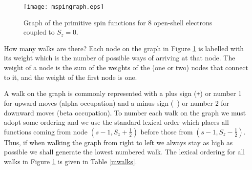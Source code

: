\documentclass[fullpage,12pt,fleqn]{article}
\newcommand{\half}{\frac{1}{2}}
\begin{document}
\begin{figure}[htbp]

\center

\texttt{[image: mspingraph.eps]}
\caption{\label{mgraph} Graph of the primitive spin functions for 8
open-shell electrons coupled to $S_z=0$.}
\end{figure}

How many walks are there?  Each node on the graph in Figure
\ref{mgraph} is labelled with its weight which is the number of
possible ways of arriving at that node.  The weight of a node is the
sum of the weights of the (one or two) nodes that connect to it, and
the weight of the first node is one.  

A walk on the graph is commonly represented with a plus sign
(\verb!+!) or number 1 for upward moves (alpha occupation) and a minus
sign (\verb!-!) or number 2 for downward moves (beta occupation).  To
number each walk on the graph we must adopt some ordering and we use
the standard lexical order which places all functions coming from node
$(s-1,S_z+\half )$ before those from $(s-1,S_z-\half )$.
Thus, if when walking the graph from right to left we always stay as
high as possible we shall generate the lowest numbered walk.  The
lexical ordering for all walks in Figure \ref{mgraph} is given in
Table \ref{mwalks}.
\end{document}
